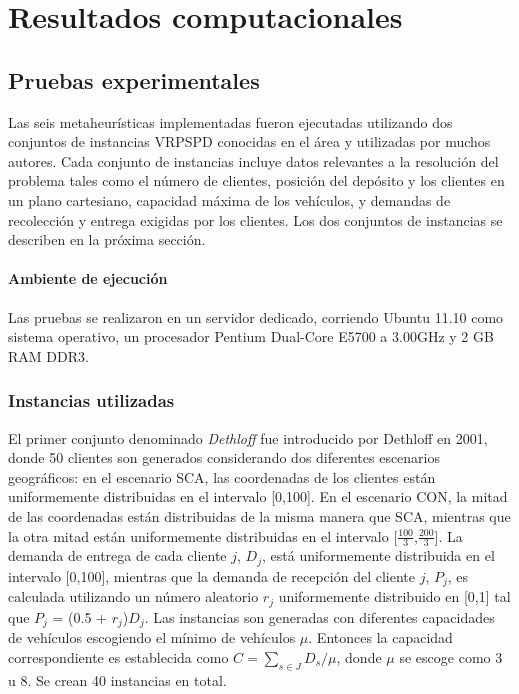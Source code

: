 \chapter{Resultados computacionales} \label{chap:resultados}

\section{Pruebas experimentales}\label{sect:pruebas}

Las seis metaheurísticas implementadas fueron ejecutadas utilizando dos conjuntos de instancias VRPSPD conocidas en el área y utilizadas por muchos autores. Cada conjunto de instancias incluye datos relevantes a la resolución del problema tales como el número de clientes, posición del depósito y los clientes en un plano cartesiano, capacidad máxima de los vehículos, y demandas de recolección y entrega exigidas por los clientes. Los dos conjuntos de instancias se describen en la próxima sección.

\subsubsection{Ambiente de ejecución}\label{subsect:ambiente}

Las pruebas se realizaron en un servidor dedicado, corriendo Ubuntu 11.10 como sistema operativo, un procesador Pentium Dual-Core E5700 a 3.00GHz y 2 GB RAM DDR3.

\subsection{Instancias utilizadas}\label{subsect:instancias}

El primer conjunto denominado \emph{Dethloff} fue introducido por Dethloff \cite{Dethloff} en 2001, donde 50 clientes son generados considerando dos diferentes escenarios geográficos: en el escenario SCA, las coordenadas de los clientes están uniformemente distribuidas en el intervalo [0,100]. En el escenario CON, la mitad de las coordenadas están distribuidas de la misma manera que SCA, mientras que la otra mitad están uniformemente distribuidas en el intervalo [$\frac{100}{3}$,$\frac{200}{3}$]. La demanda de entrega de cada cliente $j$, $D_j$, está uniformemente distribuida en el intervalo [0,100], mientras que la demanda de recepción del cliente $j$, $P_j$, es calculada utilizando un número aleatorio $r_j$ uniformemente distribuido en [0,1] tal que $P_j$ = (0.5 + $r_j$)$D_j$. Las instancias son generadas con diferentes capacidades de vehículos escogiendo el mínimo de vehículos $\mu$. Entonces la capacidad correspondiente es establecida como $C = \sum_{s \in J}D_s/\mu$, donde $\mu$ se escoge como 3 u 8. Se crean 40 instancias en total.

